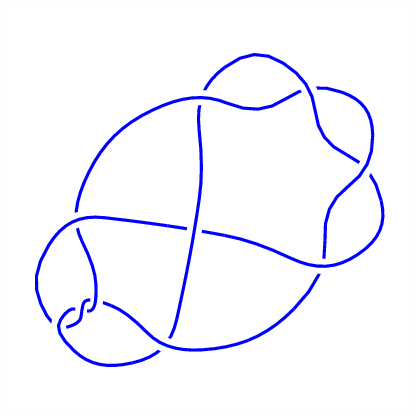 \begin{figure}[H]
\begin{minipage}[b]{.18\linewidth}
    \end{minipage}
    \begin{minipage}[b]{.18\linewidth}
        \centering
        \includegraphics[width=\linewidth]{../data/10_16.png}
    \end{minipage}
\end{figure}
